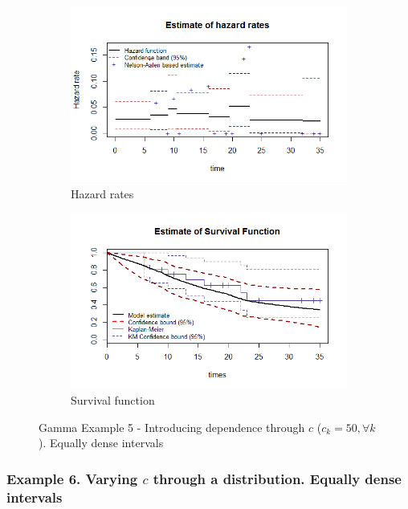 \documentclass[letterpaper]{article}\usepackage[]{graphicx}\usepackage[]{color}
\begin{document}
\begin{figure}
  \centering
  \begin{subfigure}[a]{\textwidth}\centering
    \includegraphics[width=\textwidth]{G51.png}
    \caption{Hazard rates}
  \end{subfigure}
  \begin{subfigure}[b]{\textwidth}\centering
    \includegraphics[width=\textwidth]{G52.png}
    \caption{Survival function}
  \end{subfigure}
  \caption{Gamma Example 5 - Introducing dependence through $c$ ($c_k=50, \forall k$). Equally dense intervals}
  \label{fig:G5}
\end{figure}

\subsubsection{Example 6. Varying $c$ through a distribution. Equally dense intervals}
\end{document}
